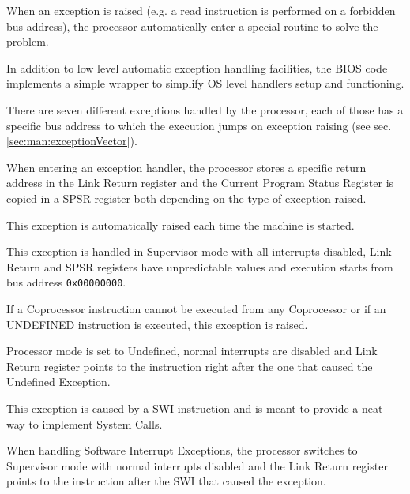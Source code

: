 \vspace{5px}
\begin{adjustbox}{center}

\end{adjustbox}
\vspace{5px}


When an exception is raised (e.g. a read instruction is performed on a forbidden bus address), the processor automatically enter a special routine to solve the problem. 

In addition to low level automatic exception handling facilities, the BIOS code implements a simple wrapper to simplify OS level handlers setup and functioning.


There are seven different exceptions handled by the processor, each of those has a specific bus address to which the execution jumps on exception raising (see sec. \ref{sec:man:exceptionVector}).

When entering an exception handler, the processor stores a specific return address in the Link Return register and the Current Program Status Register is copied in a SPSR register both depending on the type of exception raised.

This exception is automatically raised each time the machine is started. 

This exception is handled in Supervisor mode with all interrupts disabled, Link Return and SPSR registers have unpredictable values and execution starts from bus address \texttt{0x00000000}.

If a Coprocessor instruction cannot be executed from any Coprocessor or if an UNDEFINED instruction is executed, this exception is raised. 

Processor mode is set to Undefined, normal interrupts are disabled and Link Return register points to the instruction right after the one that caused the Undefined Exception.

This exception is caused by a SWI instruction and is meant to provide a neat way to implement System Calls. 

When handling Software Interrupt Exceptions, the processor switches to Supervisor mode with normal interrupts disabled and the Link Return register points to the instruction after the SWI that caused the exception.

